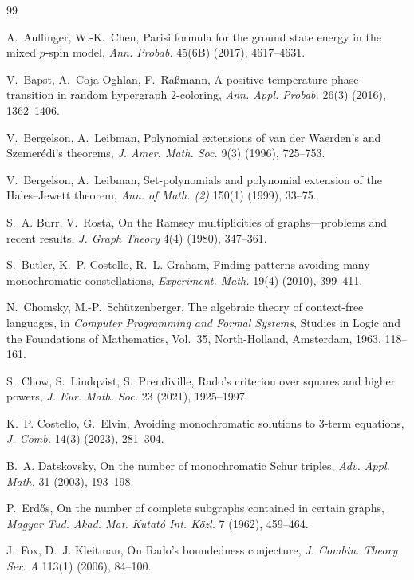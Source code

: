\documentclass[twoside,12pt]{article}
\newcommand{\1}{\mathbf 1}
\begin{document}
\begin{thebibliography}{99}

A.~Auffinger, W.-K.~Chen,
Parisi formula for the ground state energy in the mixed \(p\)-spin model,
\emph{Ann. Probab.} 45(6B) (2017), 4617--4631.

V.~Bapst, A.~Coja-Oghlan, F.~Ra{\ss}mann,
A positive temperature phase transition in random hypergraph \(2\)-coloring,
\emph{Ann. Appl. Probab.} 26(3) (2016), 1362--1406.

V.~Bergelson, A.~Leibman,
Polynomial extensions of van der Waerden's and Szemer\'edi's theorems,
\emph{J. Amer. Math. Soc.} 9(3) (1996), 725--753.

V.~Bergelson, A.~Leibman,
Set-polynomials and polynomial extension of the Hales--Jewett theorem,
\emph{Ann. of Math. (2)} 150(1) (1999), 33--75.

S.~A. Burr, V.~Rosta,
On the Ramsey multiplicities of graphs---problems and recent results,
\emph{J. Graph Theory} 4(4) (1980), 347--361.

S.~Butler, K.~P. Costello, R.~L. Graham,
Finding patterns avoiding many monochromatic constellations,
\emph{Experiment. Math.} 19(4) (2010), 399--411.

N.~Chomsky, M.-P.~Sch\"utzenberger,
The algebraic theory of context-free languages,
in \emph{Computer Programming and Formal Systems},
Studies in Logic and the Foundations of Mathematics, Vol.~35,
North-Holland, Amsterdam, 1963, 118--161.

S.~Chow, S.~Lindqvist, S.~Prendiville,
Rado's criterion over squares and higher powers,
\emph{J. Eur. Math. Soc.} 23 (2021), 1925--1997.

K.~P. Costello, G.~Elvin,
Avoiding monochromatic solutions to \(3\)-term equations,
\emph{J. Comb.} 14(3) (2023), 281--304.

B.~A. Datskovsky,
On the number of monochromatic Schur triples,
\emph{Adv. Appl. Math.} 31 (2003), 193--198.

P.~Erd\H{o}s,
On the number of complete subgraphs contained in certain graphs,
\emph{Magyar Tud. Akad. Mat. Kutat\'o Int. K\"ozl.} 7 (1962), 459--464.

J.~Fox, D.~J. Kleitman,
On Rado's boundedness conjecture,
\emph{J. Combin. Theory Ser. A} 113(1) (2006), 84--100.


\end{thebibliography}
\end{document}
